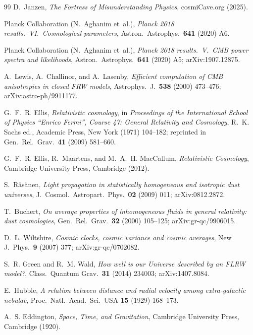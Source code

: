 \documentclass[11pt,a4paper]{article}
\begin{document}
\begin{thebibliography}{99}
D.~Janzen,
\emph{The Fortress of Misunderstanding Physics},
cosmiCave.org (2025).

Planck Collaboration (N.~Aghanim et~al.),
\emph{Planck 2018 results.~VI.~Cosmological parameters},
Astron.~Astrophys.~\textbf{641} (2020) A6.

Planck Collaboration (N.~Aghanim et~al.),
\emph{Planck 2018 results.~V.~CMB power spectra and likelihoods},
Astron.~Astrophys.~\textbf{641} (2020) A5; arXiv:1907.12875.

A.~Lewis, A.~Challinor, and A.~Lasenby,
\emph{Efficient computation of CMB anisotropies in closed FRW models},
Astrophys.~J.~\textbf{538} (2000) 473--476; arXiv:astro-ph/9911177.

G.~F.~R. Ellis,
\emph{Relativistic cosmology},
in \emph{Proceedings of the International School of Physics ``Enrico Fermi'', Course 47: General Relativity and Cosmology}, R.~K. Sachs ed., Academic Press, New York (1971) 104--182; reprinted in Gen.~Rel.~Grav.~\textbf{41} (2009) 581--660.

G.~F.~R. Ellis, R.~Maartens, and M.~A.~H. MacCallum,
\emph{Relativistic Cosmology},
Cambridge University Press, Cambridge (2012).

S.~R\"as\"anen,
\emph{Light propagation in statistically homogeneous and isotropic dust universes},
J.~Cosmol.~Astropart.~Phys.~\textbf{02} (2009) 011; arXiv:0812.2872.

T.~Buchert,
\emph{On average properties of inhomogeneous fluids in general relativity: dust cosmologies},
Gen.~Rel.~Grav.~\textbf{32} (2000) 105--125; arXiv:gr-qc/9906015.

D.~L. Wiltshire,
\emph{Cosmic clocks, cosmic variance and cosmic averages},
New J.~Phys.~\textbf{9} (2007) 377; arXiv:gr-qc/0702082.

S.~R. Green and R.~M. Wald,
\emph{How well is our Universe described by an FLRW model?},
Class.~Quantum Grav.~\textbf{31} (2014) 234003; arXiv:1407.8084.

E.~Hubble,
\emph{A relation between distance and radial velocity among extra-galactic nebulae},
Proc.~Natl.~Acad.~Sci.~USA \textbf{15} (1929) 168--173.

A.~S. Eddington,
\emph{Space, Time, and Gravitation},
Cambridge University Press, Cambridge (1920).


\end{thebibliography}
\end{document}
